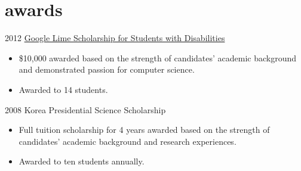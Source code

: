 \documentclass[]{patyoon-cv}
\begin{document}
\section{awards}

\begin{entrylist}
  \entry
      {2012}
      {\href{http://www.limeconnect.com/opportunities/page/google-lime-scholarship-program}
        {Google Lime Scholarship for Students with Disabilities}}
      { }
      {
        \begin{itemize}
        \item \$10,000 awarded based on the strength of candidates' academic background and demonstrated passion for computer science.
        \item Awarded to 14 students.
        \end{itemize}}
   \entry
       {2008}
       {Korea Presidential Science Scholarship}
       { }
       {
         \begin{itemize}
         \item Full tuition scholarship for 4 years awarded based on the strength of candidates' academic background and research experiences.
         \item Awarded to ten students annually.
         \end{itemize}
       }
\end{entrylist}
\end{document}
